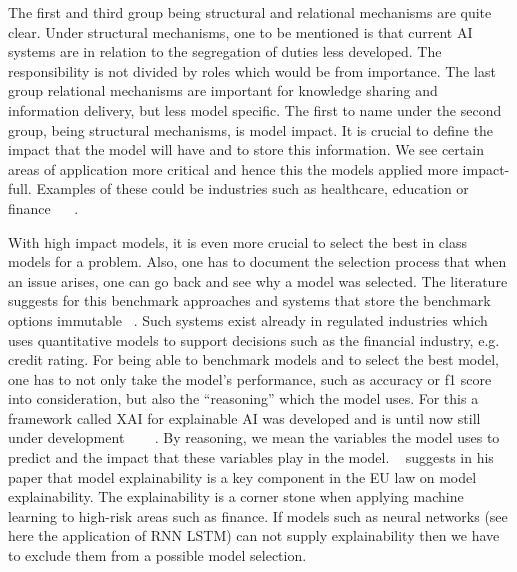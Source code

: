 \documentclass[jou,apacite]{apa6}
\begin{document}
The first and third group being structural and relational mechanisms are quite clear. Under structural mechanisms, one to be mentioned is that current AI systems are in relation to the segregation of duties less developed. The responsibility is not divided by roles which would be from importance. The last group relational mechanisms are important for knowledge sharing and information delivery, but less model specific. The first to name under the second group, being structural mechanisms, is model impact. It is crucial to define the impact that the model will have and to store this information. We see certain areas of application more critical and hence this the models applied more impact-full. Examples of these could be industries such as healthcare, education or finance ~\cite{angwin2016machine} ~\cite{mitchell2019model}. \par

With high impact models, it is even more crucial to select the best in class models for a problem. Also, one has to document the selection process that when an issue arises, one can go back and see why a model was selected. The literature suggests for this benchmark approaches and systems that store the benchmark options immutable ~\cite{gebru2018datasheets}. Such systems exist already in regulated industries which uses quantitative models to support decisions such as the financial industry, e.g. credit rating. For being able to benchmark models and to select the best model, one has to not only take the model’s performance, such as accuracy or f1 score into consideration, but also the “reasoning” which the model uses. For this a framework called XAI for explainable AI was developed and is until now still under development~\cite{adadi2018peeking} ~\cite{schneider2019personalized} ~\cite{das2020opportunities}. By reasoning, we mean the variables the model uses to predict and the impact that these variables play in the model. ~\cite{goodman2017european} suggests in his paper that model explainability  is a key component in the EU law on model explainability. The explainability is a corner stone when applying machine learning to high-risk areas such as finance. If models such as neural networks (see here the application of RNN LSTM) can not supply explainability then we have to exclude them from a possible model selection. ~\cite{goodman2017european}
\end{document}
